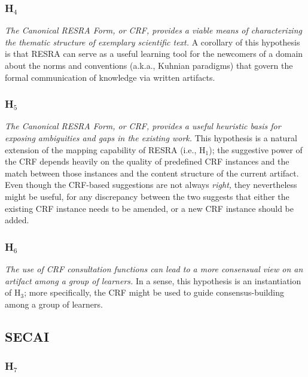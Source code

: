 \subsubsection{H\(_4\)}
\label{sec:RESRA4}

{\it The Canonical RESRA Form, or CRF, provides a viable means of
characterizing the thematic structure of exemplary scientific text.} A
corollary of this hypothesis is that RESRA can serve as a useful learning
tool for the newcomers of a domain about the norms and conventions (a.k.a.,
Kuhnian paradigms) that govern the formal communication of knowledge via
written artifacts.


\subsubsection{H\(_5\)}
\label{sec:RESRA5}

{\it The Canonical RESRA Form, or CRF, provides a useful heuristic basis
for exposing ambiguities and gaps in the existing work.} This hypothesis is
a natural extension of the mapping capability of RESRA (i.e., {\sf
H\(_1\)}); the suggestive power of the CRF depends heavily on the quality
of predefined CRF instances and the match between those instances and the
content structure of the current artifact.  Even though the CRF-based
suggestions are not always {\it right,\/} they nevertheless might be useful,
for any discrepancy between the two suggests that either the existing CRF
instance needs to be amended, or a new CRF instance should be added.


\subsubsection{H\(_6\)}
\label{sec:RESRA6}

{\it The use of CRF consultation functions can lead to a more consensual
view on an artifact among a group of learners.} In a sense, this hypothesis
is an instantiation of {\sf H\(_3\)\/}; more specifically, the CRF might be
used to guide consensus-building among a group of learners.


\subsection{SECAI}
\label{sec:SECAI hypothesis}

\subsubsection{H\(_7\)}
\label{sec:SM1}


